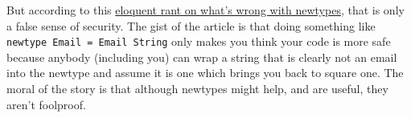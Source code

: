 \documentclass[12pt]{article}
\begin{document}
But according to this
\href{http://degoes.net/articles/newtypes-suck/}{eloquent rant on what's
wrong with newtypes}, that is only a false sense of security. The gist
of the article is that doing something like
\texttt{newtype\ Email\ =\ Email\ String} only makes you think your code
is more safe because anybody (including you) can wrap a string that is
clearly not an email into the newtype and assume it is one which brings
you back to square one. The moral of the story is that although newtypes
might help, and are useful, they aren't foolproof.
\end{document}

